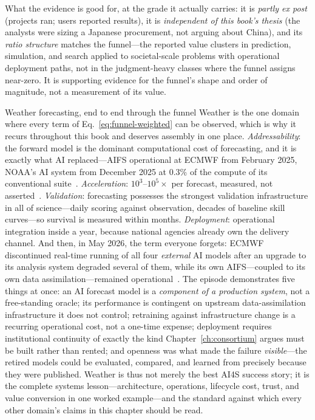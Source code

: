 What the evidence is good for, at the grade it actually carries: it is \emph{partly ex post} (projects ran; users reported results), it is \emph{independent of this book's thesis} (the analysts were sizing a Japanese procurement, not arguing about China), and its \emph{ratio structure} matches the funnel---the reported value clusters in prediction, simulation, and search applied to societal-scale problems with operational deployment paths, not in the judgment-heavy classes where the funnel assigns near-zero. It is supporting evidence for the funnel's shape and order of magnitude, not a measurement of its value.

\begin{casestudy}{Weather forecasting, end to end through the funnel}
Weather is the one domain where every term of Eq.~\eqref{eq:funnel-weighted} can be observed, which is why it recurs throughout this book and deserves assembly in one place. \emph{Addressability}: the forward model is the dominant computational cost of forecasting, and it is exactly what AI replaced---AIFS operational at ECMWF from February 2025, NOAA's AI system from December 2025 at 0.3\% of the compute of its conventional suite~\cite{ecmwf-aifs,noaa-ai}. \emph{Acceleration}: $10^3$--$10^5\times$ per forecast, measured, not asserted~\cite{aurora,neuralgcm}. \emph{Validation}: forecasting possesses the strongest validation infrastructure in all of science---daily scoring against observation, decades of baseline skill curves---so survival is measured within months. \emph{Deployment}: operational integration inside a year, because national agencies already own the delivery channel. And then, in May 2026, the term everyone forgets: ECMWF discontinued real-time running of all four \emph{external} AI models after an upgrade to its analysis system degraded several of them, while its own AIFS---coupled to its own data assimilation---remained operational~\cite{ecmwf-farewell}. The episode demonstrates five things at once: an AI forecast model is a \emph{component of a production system}, not a free-standing oracle; its performance is contingent on upstream data-assimilation infrastructure it does not control; retraining against infrastructure change is a recurring operational cost, not a one-time expense; deployment requires institutional continuity of exactly the kind Chapter~\ref{ch:consortium} argues must be built rather than rented; and openness was what made the failure \emph{visible}---the retired models could be evaluated, compared, and learned from precisely because they were published. Weather is thus not merely the best AI4S success story; it is the complete systems lesson---architecture, operations, lifecycle cost, trust, and value conversion in one worked example---and the standard against which every other domain's claims in this chapter should be read.
\end{casestudy}

